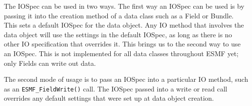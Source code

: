 

The IOSpec can be used in two ways.  The first way an IOSpec can 
be used is by passing it into the creation method of a data class 
such as a Field or Bundle.  This sets a default IOSpec for the 
data object.  Any IO method that involves the data object will 
use the settings in the default IOSpec, as long as there is no 
other IO specification that overrides it.  This brings us to the 
second way to use an IOSpec.  This is not implemented for all data
classes throughout ESMF yet; only Fields can write out data.

The second mode of usage is to pass an IOSpec into a particular 
IO method, such as an {\tt ESMF\_FieldWrite()} call.  The IOSpec 
passed into a write or read call overrides any default settings 
that were set up at data object creation.

